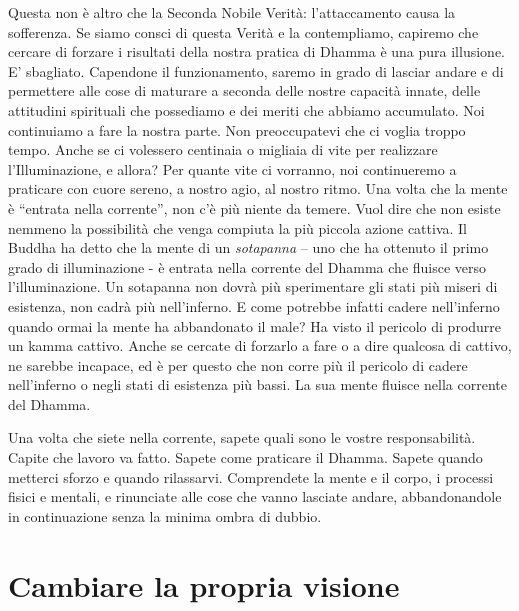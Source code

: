 Questa non è altro che la Seconda Nobile Verità: l'attaccamento causa la
sofferenza. Se siamo consci di questa Verità e la contempliamo, capiremo
che cercare di forzare i risultati della nostra pratica di Dhamma è una
pura illusione. E' sbagliato. Capendone il funzionamento, saremo in
grado di lasciar andare e di permettere alle cose di maturare a seconda
delle nostre capacità innate, delle attitudini spirituali che possediamo
e dei meriti che abbiamo accumulato. Noi continuiamo a fare la nostra
parte. Non preoccupatevi che ci voglia troppo tempo. Anche se ci
volessero centinaia o migliaia di vite per realizzare l'Illuminazione, e
allora? Per quante vite ci vorranno, noi continueremo a praticare con
cuore sereno, a nostro agio, al nostro ritmo. Una volta che la mente è
``entrata nella corrente'', non c'è più niente da temere. Vuol dire che
non esiste nemmeno la possibilità che venga compiuta la più piccola
azione cattiva. Il Buddha ha detto che la mente di
un \emph{sotapanna} -- uno che ha ottenuto il primo grado di
illuminazione - è entrata nella corrente del Dhamma che fluisce verso
l'illuminazione. Un sotapanna non dovrà più sperimentare gli stati più
miseri di esistenza, non cadrà più nell'inferno. E come potrebbe infatti
cadere nell'inferno quando ormai la mente ha abbandonato il male? Ha
visto il pericolo di produrre un kamma cattivo. Anche se cercate di
forzarlo a fare o a dire qualcosa di cattivo, ne sarebbe incapace, ed è
per questo che non corre più il pericolo di cadere nell'inferno o negli
stati di esistenza più bassi. La sua mente fluisce nella corrente del
Dhamma.

Una volta che siete nella corrente, sapete quali sono le vostre
responsabilità. Capite che lavoro va fatto. Sapete come praticare il
Dhamma. Sapete quando metterci sforzo e quando rilassarvi. Comprendete
la mente e il corpo, i processi fisici e mentali, e rinunciate alle cose
che vanno lasciate andare, abbandonandole in continuazione senza la
minima ombra di dubbio.

\section{Cambiare la propria visione}

